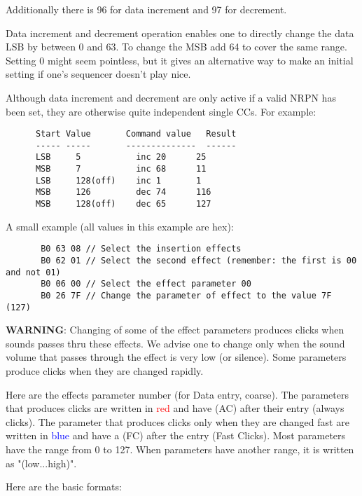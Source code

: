    Additionally there is 96 for data increment and 97 for decrement.

   Data increment and decrement operation enables one to directly change the
   data LSB by between 0 and 63. To change the MSB add 64 to cover the same
   range. Setting 0 might seem pointless, but it gives an alternative way
   to make an initial setting if one's sequencer doesn't play nice.

   Although data increment and decrement are only active if a valid NRPN has
   been set, they are otherwise quite independent single CCs.  For example:

   \begin{verbatim}
      Start Value       Command value   Result
      ----- -----       --------------  ------
      LSB     5           inc 20      25
      MSB     7           inc 68      11
      LSB     128(off)    inc 1       1
      MSB     126         dec 74      116
      MSB     128(off)    dec 65      127
   \end{verbatim}

   A small example (all values in this example are hex):

   \begin{verbatim}
       B0 63 08 // Select the insertion effects
       B0 62 01 // Select the second effect (remember: the first is 00 and not 01)
       B0 06 00 // Select the effect parameter 00
       B0 26 7F // Change the parameter of effect to the value 7F (127)
   \end{verbatim}

   \textbf{WARNING}:
   Changing of some of the effect parameters produces clicks when sounds
   passes thru these effects.  We advise one to change only when the sound
   volume that passes through the effect is very low (or silence).  Some
   parameters produce clicks when they are changed rapidly.

   Here are the effects parameter number (for Data entry, coarse).
   The parameters that produces clicks are written in \textcolor{red}{red}
   and have (AC) after their entry (always clicks).
   The parameter that produces clicks only when they are changed fast are
   written in \textcolor{blue}{blue} and have a (FC) after the entry (Fast
   Clicks).
   Most parameters have the range from 0 to 127.
   When parameters have another range, it is written as "(low...high)".

   Here are the basic formats:

